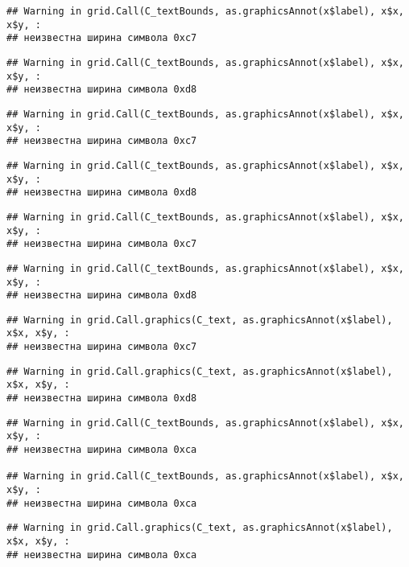 \documentclass[
]{article}
\begin{document}
\begin{verbatim}
## Warning in grid.Call(C_textBounds, as.graphicsAnnot(x$label), x$x, x$y, :
## неизвестна ширина символа 0xc7
\end{verbatim}

\begin{verbatim}
## Warning in grid.Call(C_textBounds, as.graphicsAnnot(x$label), x$x, x$y, :
## неизвестна ширина символа 0xd8
\end{verbatim}

\begin{verbatim}
## Warning in grid.Call(C_textBounds, as.graphicsAnnot(x$label), x$x, x$y, :
## неизвестна ширина символа 0xc7
\end{verbatim}

\begin{verbatim}
## Warning in grid.Call(C_textBounds, as.graphicsAnnot(x$label), x$x, x$y, :
## неизвестна ширина символа 0xd8
\end{verbatim}

\begin{verbatim}
## Warning in grid.Call(C_textBounds, as.graphicsAnnot(x$label), x$x, x$y, :
## неизвестна ширина символа 0xc7
\end{verbatim}

\begin{verbatim}
## Warning in grid.Call(C_textBounds, as.graphicsAnnot(x$label), x$x, x$y, :
## неизвестна ширина символа 0xd8
\end{verbatim}

\begin{verbatim}
## Warning in grid.Call.graphics(C_text, as.graphicsAnnot(x$label), x$x, x$y, :
## неизвестна ширина символа 0xc7
\end{verbatim}

\begin{verbatim}
## Warning in grid.Call.graphics(C_text, as.graphicsAnnot(x$label), x$x, x$y, :
## неизвестна ширина символа 0xd8
\end{verbatim}

\begin{verbatim}
## Warning in grid.Call(C_textBounds, as.graphicsAnnot(x$label), x$x, x$y, :
## неизвестна ширина символа 0xca

## Warning in grid.Call(C_textBounds, as.graphicsAnnot(x$label), x$x, x$y, :
## неизвестна ширина символа 0xca
\end{verbatim}

\begin{verbatim}
## Warning in grid.Call.graphics(C_text, as.graphicsAnnot(x$label), x$x, x$y, :
## неизвестна ширина символа 0xca
\end{verbatim}
\end{document}
